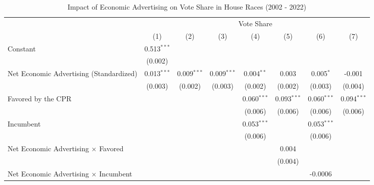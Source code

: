 
\begin{table}[htbp]
   \caption{Impact of Economic Advertising on Vote Share in House Races (2002 - 2022)}
   \bigskip
   \centering
   \small
   \begin{tabular}{lccccccc}
      \toprule
       & \multicolumn{7}{c}{Vote Share}\\
                                                    & (1)           & (2)           & (3)           & (4)           & (5)           & (6)           & (7)\\  
      \midrule 
      Constant                                      & 0.513$^{***}$ &               &               &               &               &               &   \\   
                                                    & (0.002)       &               &               &               &               &               &   \\   
      Net Economic Advertising (Standardized)       & 0.013$^{***}$ & 0.009$^{***}$ & 0.009$^{***}$ & 0.004$^{**}$  & 0.003         & 0.005$^{*}$   & -0.001\\   
                                                    & (0.003)       & (0.002)       & (0.003)       & (0.002)       & (0.002)       & (0.003)       & (0.004)\\   
      Favored by the CPR                            &               &               &               & 0.060$^{***}$ & 0.093$^{***}$ & 0.060$^{***}$ & 0.094$^{***}$\\   
                                                    &               &               &               & (0.006)       & (0.006)       & (0.006)       & (0.006)\\   
      Incumbent                                     &               &               &               & 0.053$^{***}$ &               & 0.053$^{***}$ &   \\   
                                                    &               &               &               & (0.006)       &               & (0.006)       &   \\   
      Net Economic Advertising × Favored            &               &               &               &               & 0.004         &               &   \\   
                                                    &               &               &               &               & (0.004)       &               &   \\   
      Net Economic Advertising × Incumbent          &               &               &               &               &               & -0.0006       &   \\   

\end{tabular}
\end{table}
